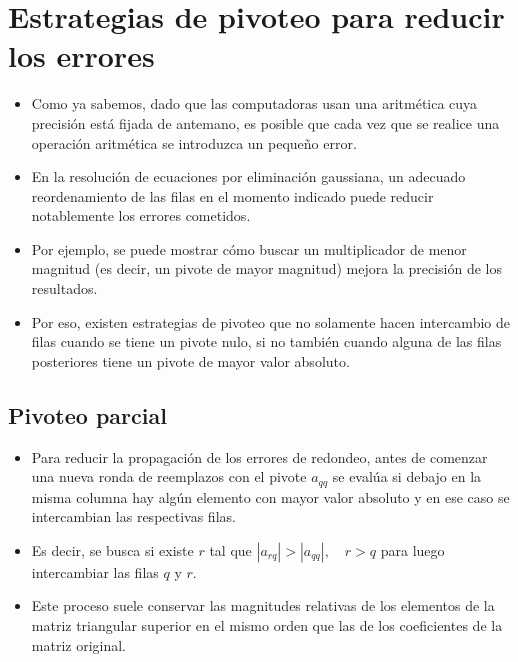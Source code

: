 \documentclass[openany]{book}
\providecommand{\tightlist}{%
  \setlength{\itemsep}{0pt}\setlength{\parskip}{0pt}}
\begin{document}
\hypertarget{estrategias-de-pivoteo-para-reducir-los-errores}{%
\section{Estrategias de pivoteo para reducir los errores}\label{estrategias-de-pivoteo-para-reducir-los-errores}}

\begin{itemize}
\tightlist
\item
  Como ya sabemos, dado que las computadoras usan una aritmética cuya precisión está fijada de antemano, es posible que cada vez que se realice una operación aritmética se introduzca un pequeño error.
\item
  En la resolución de ecuaciones por eliminación gaussiana, un adecuado reordenamiento de las filas en el momento indicado puede reducir notablemente los errores cometidos.
\item
  Por ejemplo, se puede mostrar cómo buscar un multiplicador de menor magnitud (es decir, un pivote de mayor magnitud) mejora la precisión de los resultados.
\item
  Por eso, existen estrategias de pivoteo que no solamente hacen intercambio de filas cuando se tiene un pivote nulo, si no también cuando alguna de las filas posteriores tiene un pivote de mayor valor absoluto.
\end{itemize}

\hypertarget{pivoteo-parcial}{%
\subsection{Pivoteo parcial}\label{pivoteo-parcial}}

\begin{itemize}
\tightlist
\item
  Para reducir la propagación de los errores de redondeo, antes de comenzar una nueva ronda de reemplazos con el pivote \(a_{qq}\) se evalúa si debajo en la misma columna hay algún elemento con mayor valor absoluto y en ese caso se intercambian las respectivas filas.
\item
  Es decir, se busca si existe \(r\) tal que \(|a_{rq}| > |a_{qq}|,\quad r>q\) para luego intercambiar las filas \(q\) y \(r\).
\item
  Este proceso suele conservar las magnitudes relativas de los elementos de la matriz triangular superior en el mismo orden que las de los coeficientes de la matriz original.
\end{itemize}
\end{document}
